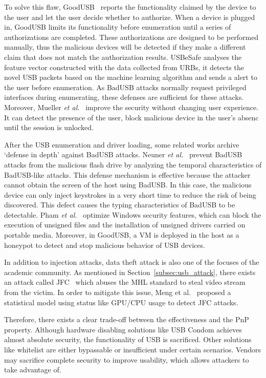 To solve this flaw, GoodUSB~\cite{tian2015defending} reports the functionality claimed
by the device to the user and let the user decide whether to authorize. When a device
is plugged in, GoodUSB limits its functionality before enumeration until a
series of authorizations are completed. These authorizations are designed to be
performed manually, thus the malicious devices will be detected if they make a different claim 
that does not match the authorization results. 
USBeSafe\cite{usbesafe} analyses the 
feature vector constructed with the data collected from \acp{URB}, 
it detects the novel \ac{USB} packets based on the machine learning algorithm and sends 
a alert to the user before enumeration. As BadUSB attacks normally request privileged 
interfaces during enumerating, these defenses are sufficient for these attacks.
Moreover, Mueller \emph{et al.}~\cite{MuellerZN19} improve the security without changing user experience. It can detect the presence of the user, block malicious device in the user's absenc until the session is unlocked.

After the \ac{USB} enumeration and driver loading, some related works
archive `defense in depth'
against BadUSB attacks.  Neuner \emph{et al.}~\cite{neuner2018usblock}
prevent BadUSB attacks from the malicious flash drive by analyzing
the temporal characteristics of BadUSB-like attacks. This defense mechanism is
effective because the attacker cannot obtain the screen of the host using
BadUSB. In this case, the malicious device can only inject keystrokes in a very
short time to reduce the risk of being discovered. This defect causes the
typing characteristics of BadUSB to be detectable. Pham \emph{et al.}~\cite{pham2010optimizing} optimize Windows security features, which can
block the execution of unsigned files and the installation of unsigned drivers
carried on portable media. Moreover, in GoodUSB, a VM is deployed in the host as
a honeypot to detect and stop malicious behavior of \ac{USB} devices.

In addition to injection attacks, data theft attack is also one of the focuses
of the academic community. As mentioned in Section~\ref{subsec:usb_attack}, there
exists an attack called JFC~\cite{JFC} which abuses the \ac{MHL}
standard to steal video stream from the victim. In order to mitigate this
issue, Meng et al.~\cite{meng2018252} proposed a statistical model using status
like GPU/CPU usage to detect JFC attacks.

Therefore, there exists a clear trade-off between the effectiveness and the
\ac{PnP} property. Although hardware disabling solutions like \ac{USB} Condom
achieves almost absolute security, the functionality of \ac{USB} is sacrificed.
Other solutions like whitelist are either bypassable or insufficient
under certain scenarios. Vendors may sacrifice complete security to
improve usability, which allows attackers to take advantage of.

